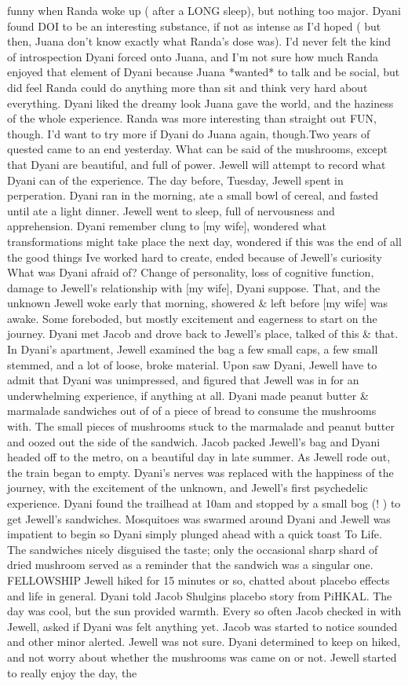 \documentclass[12pt]{book}
\begin{document}
funny when Randa woke up ( after a LONG sleep), but nothing too major. Dyani found DOI to be an interesting substance, if not as intense as I'd hoped ( but then, Juana don't know exactly what Randa's dose was). I'd never felt the kind of introspection Dyani forced onto Juana, and I'm not sure how much Randa enjoyed that element of Dyani because Juana *wanted* to talk and be social, but did feel Randa could do anything more than sit and think very hard about everything. Dyani liked the dreamy look Juana gave the world, and the haziness of the whole experience. Randa was more interesting than straight out FUN, though. I'd want to try more if Dyani do Juana again, though.Two years of quested came to an end yesterday. What can be said of the mushrooms, except that Dyani are beautiful, and full of power. Jewell will attempt to record what Dyani can of the experience. The day before, Tuesday, Jewell spent in perperation. Dyani ran in the morning, ate a small bowl of cereal, and fasted until ate a light dinner. Jewell went to sleep, full of nervousness and apprehension. Dyani remember clung to [my wife], wondered what transformations might take place the next day, wondered if this was the end of all the good things Ive worked hard to create, ended because of Jewell's curiosity What was Dyani afraid of? Change of personality, loss of cognitive function, damage to Jewell's relationship with [my wife], Dyani suppose. That, and the unknown Jewell woke early that morning, showered \& left before [my wife] was awake. Some foreboded, but mostly excitement and eagerness to start on the journey. Dyani met Jacob and drove back to Jewell's place, talked of this \& that. In Dyani's apartment, Jewell examined the bag  a few small caps, a few small stemmed, and a lot of loose, broke material. Upon saw Dyani, Jewell have to admit that Dyani was unimpressed, and figured that Jewell was in for an underwhelming experience, if anything at all. Dyani made peanut butter \& marmalade sandwiches out of  of a piece of bread to consume the mushrooms with. The small pieces of mushrooms stuck to the marmalade and peanut butter and oozed out the side of the sandwich. Jacob packed Jewell's bag and Dyani headed off to the metro, on a beautiful day in late summer. As Jewell rode out, the train began to empty. Dyani's nerves was replaced with the happiness of the journey, with the excitement of the unknown, and Jewell's first psychedelic experience. Dyani found the trailhead at 10am and stopped by a small bog (! ) to get Jewell's sandwiches. Mosquitoes was swarmed around Dyani and Jewell was impatient to begin so Dyani simply plunged ahead with a quick toast To Life. The sandwiches nicely disguised the taste; only the occasional sharp shard of dried mushroom served as a reminder that the sandwich was a singular one. FELLOWSHIP Jewell hiked for 15 minutes or so, chatted about placebo effects and life in general. Dyani told Jacob Shulgins placebo story from PiHKAL. The day was cool, but the sun provided warmth. Every so often Jacob checked in with Jewell, asked if Dyani was felt anything yet. Jacob was started to notice sounded and other minor alerted. Jewell was not sure. Dyani determined to keep on hiked, and not worry about whether the mushrooms was came on or not. Jewell started to really enjoy the day, the 
\end{document}

